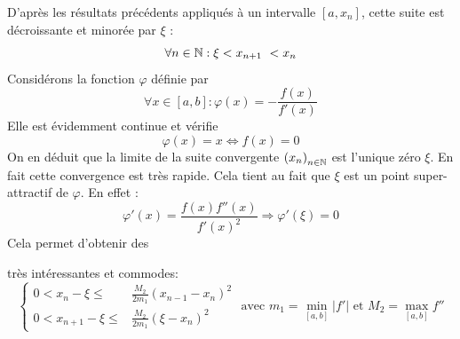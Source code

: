 D'après les résultats précédents appliqués à un intervalle $[a,x_n]$, cette suite est décroissante et minorée par $\xi$ :
\begin{displaymath}
 \forall n\in \N : \xi < x_{n+1} < x_n
\end{displaymath}
Considérons la fonction $\varphi$ définie par 
\begin{displaymath}
\forall x\in [a,b] : \varphi(x) = -\frac{f(x)}{f'(x)} 
\end{displaymath}
Elle est évidemment continue et vérifie 
\begin{displaymath}
 \varphi(x)=x \Leftrightarrow f(x)=0
\end{displaymath}
On en déduit que la limite de la suite convergente $\left(x_n \right)_{n\in\mathbb{N}}$ est l'unique zéro $\xi$.\newline
En fait cette convergence est très rapide. Cela tient au fait que $\xi$ est un point \og super-attractif \fg de $\varphi$. En effet :
\begin{displaymath}
 \varphi'(x) = \frac{f(x)f''(x)}{f'(x)^2} \Rightarrow \varphi'(\xi)=0
\end{displaymath}
Cela permet d'obtenir des  très intéressantes et commodes:
\begin{displaymath}
 \left\lbrace 
\begin{aligned}
 0< x_n -\xi \leq&\frac{M_2}{2m_1}(x_{n-1}-x_n)^2\\
 0< x_{n+1}-\xi \leq&\frac{M_2}{2m_1}(\xi-x_n)^2
\end{aligned}
\right. 
\text{ avec } m_1 = \min_{[a,b]}|f'| \text{ et } M_2 = \max_{[a,b]}f'' 
\end{displaymath}
